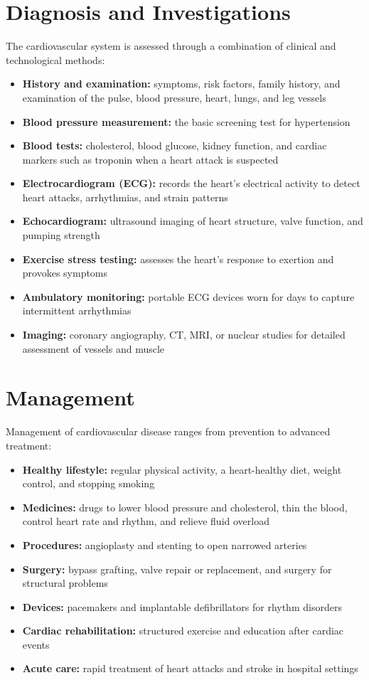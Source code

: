 \section*{Diagnosis and Investigations}
The cardiovascular system is assessed through a combination of clinical and technological methods:
\begin{itemize}
    \item \textbf{History and examination:} symptoms, risk factors, family history, and examination of the pulse, blood pressure, heart, lungs, and leg vessels
    \item \textbf{Blood pressure measurement:} the basic screening test for hypertension
    \item \textbf{Blood tests:} cholesterol, blood glucose, kidney function, and cardiac markers such as troponin when a heart attack is suspected
    \item \textbf{Electrocardiogram (ECG):} records the heart's electrical activity to detect heart attacks, arrhythmias, and strain patterns
    \item \textbf{Echocardiogram:} ultrasound imaging of heart structure, valve function, and pumping strength
    \item \textbf{Exercise stress testing:} assesses the heart's response to exertion and provokes symptoms
    \item \textbf{Ambulatory monitoring:} portable ECG devices worn for days to capture intermittent arrhythmias
    \item \textbf{Imaging:} coronary angiography, CT, MRI, or nuclear studies for detailed assessment of vessels and muscle
\end{itemize}

\section*{Management}
Management of cardiovascular disease ranges from prevention to advanced treatment:
\begin{itemize}
    \item \textbf{Healthy lifestyle:} regular physical activity, a heart-healthy diet, weight control, and stopping smoking
    \item \textbf{Medicines:} drugs to lower blood pressure and cholesterol, thin the blood, control heart rate and rhythm, and relieve fluid overload
    \item \textbf{Procedures:} angioplasty and stenting to open narrowed arteries
    \item \textbf{Surgery:} bypass grafting, valve repair or replacement, and surgery for structural problems
    \item \textbf{Devices:} pacemakers and implantable defibrillators for rhythm disorders
    \item \textbf{Cardiac rehabilitation:} structured exercise and education after cardiac events
    \item \textbf{Acute care:} rapid treatment of heart attacks and stroke in hospital settings
\end{itemize}

